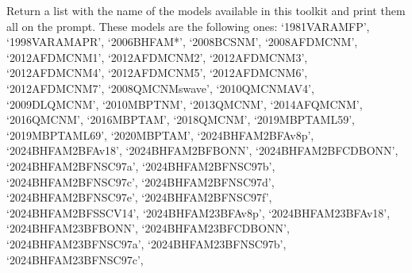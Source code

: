 \documentclass[letterpaper,10pt,english]{sphinxmanual}
\begin{document}
\begin{fulllineitems}
\label{\detokenize{source/api/setup_micro:nucleardatapy.setup_micro.models_micro}}
\pysigstartsignatures
{}
\pysigstopsignatures
\sphinxAtStartPar
Return a list with the name of the models available in this toolkit and     print them all on the prompt. These models are the following ones:     ‘1981\sphinxhyphen{}VAR\sphinxhyphen{}AM\sphinxhyphen{}FP’, ‘1998\sphinxhyphen{}VAR\sphinxhyphen{}AM\sphinxhyphen{}APR’, ‘2006\sphinxhyphen{}BHF\sphinxhyphen{}AM*’, ‘2008\sphinxhyphen{}BCS\sphinxhyphen{}NM’, ‘2008\sphinxhyphen{}AFDMC\sphinxhyphen{}NM’,     ‘2012\sphinxhyphen{}AFDMC\sphinxhyphen{}NM\sphinxhyphen{}1’, ‘2012\sphinxhyphen{}AFDMC\sphinxhyphen{}NM\sphinxhyphen{}2’, ‘2012\sphinxhyphen{}AFDMC\sphinxhyphen{}NM\sphinxhyphen{}3’, ‘2012\sphinxhyphen{}AFDMC\sphinxhyphen{}NM\sphinxhyphen{}4’,     ‘2012\sphinxhyphen{}AFDMC\sphinxhyphen{}NM\sphinxhyphen{}5’, ‘2012\sphinxhyphen{}AFDMC\sphinxhyphen{}NM\sphinxhyphen{}6’, ‘2012\sphinxhyphen{}AFDMC\sphinxhyphen{}NM\sphinxhyphen{}7’,     ‘2008\sphinxhyphen{}QMC\sphinxhyphen{}NM\sphinxhyphen{}swave’, ‘2010\sphinxhyphen{}QMC\sphinxhyphen{}NM\sphinxhyphen{}AV4’, ‘2009\sphinxhyphen{}DLQMC\sphinxhyphen{}NM’, ‘2010\sphinxhyphen{}MBPT\sphinxhyphen{}NM’,     ‘2013\sphinxhyphen{}QMC\sphinxhyphen{}NM’, ‘2014\sphinxhyphen{}AFQMC\sphinxhyphen{}NM’, ‘2016\sphinxhyphen{}QMC\sphinxhyphen{}NM’, ‘2016\sphinxhyphen{}MBPT\sphinxhyphen{}AM’,     ‘2018\sphinxhyphen{}QMC\sphinxhyphen{}NM’, ‘2019\sphinxhyphen{}MBPT\sphinxhyphen{}AM\sphinxhyphen{}L59’, ‘2019\sphinxhyphen{}MBPT\sphinxhyphen{}AM\sphinxhyphen{}L69’,     ‘2020\sphinxhyphen{}MBPT\sphinxhyphen{}AM’,    ‘2024\sphinxhyphen{}BHF\sphinxhyphen{}AM\sphinxhyphen{}2BF\sphinxhyphen{}Av8p’, ‘2024\sphinxhyphen{}BHF\sphinxhyphen{}AM\sphinxhyphen{}2BF\sphinxhyphen{}Av18’, ‘2024\sphinxhyphen{}BHF\sphinxhyphen{}AM\sphinxhyphen{}2BF\sphinxhyphen{}BONN’, ‘2024\sphinxhyphen{}BHF\sphinxhyphen{}AM\sphinxhyphen{}2BF\sphinxhyphen{}CDBONN’,     ‘2024\sphinxhyphen{}BHF\sphinxhyphen{}AM\sphinxhyphen{}2BF\sphinxhyphen{}NSC97a’, ‘2024\sphinxhyphen{}BHF\sphinxhyphen{}AM\sphinxhyphen{}2BF\sphinxhyphen{}NSC97b’, ‘2024\sphinxhyphen{}BHF\sphinxhyphen{}AM\sphinxhyphen{}2BF\sphinxhyphen{}NSC97c’, ‘2024\sphinxhyphen{}BHF\sphinxhyphen{}AM\sphinxhyphen{}2BF\sphinxhyphen{}NSC97d’,     ‘2024\sphinxhyphen{}BHF\sphinxhyphen{}AM\sphinxhyphen{}2BF\sphinxhyphen{}NSC97e’, ‘2024\sphinxhyphen{}BHF\sphinxhyphen{}AM\sphinxhyphen{}2BF\sphinxhyphen{}NSC97f’, ‘2024\sphinxhyphen{}BHF\sphinxhyphen{}AM\sphinxhyphen{}2BF\sphinxhyphen{}SSCV14’,    ‘2024\sphinxhyphen{}BHF\sphinxhyphen{}AM\sphinxhyphen{}23BF\sphinxhyphen{}Av8p’, ‘2024\sphinxhyphen{}BHF\sphinxhyphen{}AM\sphinxhyphen{}23BF\sphinxhyphen{}Av18’, ‘2024\sphinxhyphen{}BHF\sphinxhyphen{}AM\sphinxhyphen{}23BF\sphinxhyphen{}BONN’, ‘2024\sphinxhyphen{}BHF\sphinxhyphen{}AM\sphinxhyphen{}23BF\sphinxhyphen{}CDBONN’,     ‘2024\sphinxhyphen{}BHF\sphinxhyphen{}AM\sphinxhyphen{}23BF\sphinxhyphen{}NSC97a’, ‘2024\sphinxhyphen{}BHF\sphinxhyphen{}AM\sphinxhyphen{}23BF\sphinxhyphen{}NSC97b’, ‘2024\sphinxhyphen{}BHF\sphinxhyphen{}AM\sphinxhyphen{}23BF\sphinxhyphen{}NSC97c’, 
\end{fulllineitems}
\end{document}
